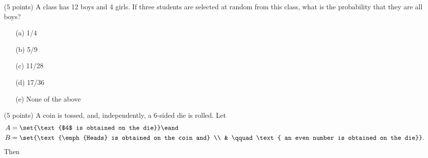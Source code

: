 \documentclass[reqno,letterpaper, onsided,10pt]{amsart}
\theoremstyle{definition}
\newcommand{\sol}[1]{\par\noindent{\bf Solution:} #1}
\renewcommand{\sol}[1]{}
\begin{document}
\sol{{\bf (d)}\\
}

\medskip

\begin{problem} ($5$ points) %
A class has 12 boys and 4 girls. If three students are selected at
random from this class, what is the probability that they are all boys?
\begin{itemize}
\item[(a)] 1/4
\vskip0.1cm
\item[(b)] 5/9
\vskip0.1cm
\item[(c)] 11/28
\vskip0.1cm
\item[(d)] 17/36
\vskip0.1cm
\item[(e)] None of the above
\end{itemize}
\end{problem}

\sol{ {\bf (c)}\\
Let $A_i$ stand for the event of choosing a boy in the $i^{th}$
selection with $i =1,2,3.$
The probability we are seeking is
\begin{equation}%
    \nonumber
    \begin{split}
      \PP[A_1 \cap A_2 \cap A_3].
    \end{split}
\end{equation}
By the multiplication rule,
\begin{equation}%
    \nonumber
    \begin{split}
      \PP[A_1 \cap A_2 \cap A_3]
           &  =  \PP[A_1]
      \PP[A_2 | A_1]
      \PP[A_3 |A_2 \cap A_1]\\
      & = \frac{12}{16} \cdot \frac{11}{15} \cdot \frac{10}{14} =
      \frac{11}{2 \cdot 14} = \frac{11}{28}\, .
    \end{split}
\end{equation}
}

\medskip

\begin{problem} ($5$ points) %
A coin is tossed, and, independently, a 6-sided die is rolled. 
 Let
\begin{align*}
A&=\set{\text{$4$ is obtained on the die}} \eand \\
B&=\set{\text{\emph{Heads} is
obtained on the coin and} \\ & \qquad \text{ an even number is obtained on the die}}.
\end{align*} 
Then
\end{problem}
\sol{The correct answer is (e).}
\end{document}
